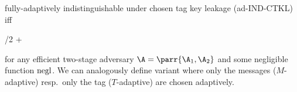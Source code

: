 \begin{definition}
\begin{sitemize}
        \item fully-adaptively indistinguishable under chosen tag key leakage (ad-IND-CTKL) iff
        \begin{bralign}
            /2 + \varepsilon\parr{\secpar}
        \end{bralign}
    \end{sitemize}
    for any efficient two-stage adversary \(\A = \parr{\A_1, \A_2}\) and some negligible function \(\operatorname{negl}\).
    We can analogously define variant where only the messages (\(M\)-adaptive) resp.\ only the tag (\(T\)-adaptive) are chosen adaptively.
\end{definition}

